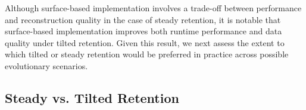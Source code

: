 Although surface-based implementation involves a trade-off between performance and reconstruction quality in the case of steady retention, it is notable that surface-based implementation improves both runtime performance and data quality under tilted retention.
Given this result, we next assess the extent to which tilted or steady retention would be preferred in practice across possible evolutionary scenarios.





\subsection{Steady vs. Tilted Retention} \label{sec:steady-vs-tilted}

